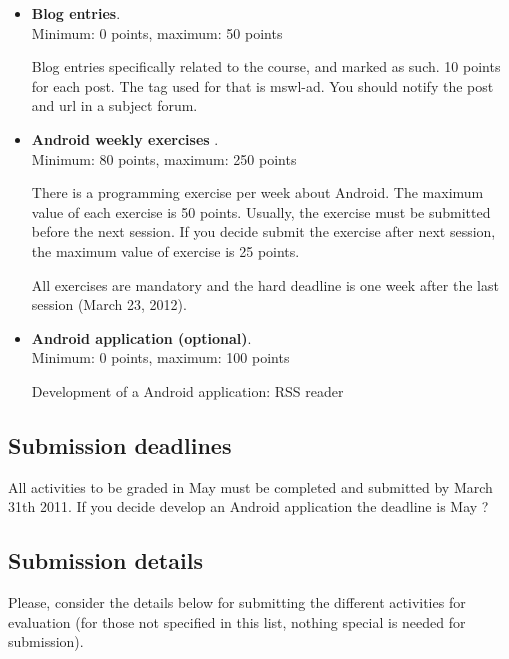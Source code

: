 \documentclass[a4paper]{article}
\begin{document}
\begin{itemize}
\item \textbf{Blog entries}. \\
  Minimum: 0 points, maximum: 50 points

  Blog entries specifically related to the course, and marked as
  such. 10 points for each post. The tag used for that is mswl-ad.
  You should notify the post and url in a subject forum.

\item \textbf{Android weekly exercises }. \\
  Minimum: 80 points, maximum: 250 points

There is a programming exercise per week about Android. The maximum
value of each exercise is 50 points. Usually, the exercise must be
submitted before the next session. If you decide submit the exercise
after next session, the maximum value of exercise is 25 points.

All exercises are mandatory and the hard deadline is one week after the
last session (March 23, 2012).


\item \textbf{Android application (optional)}. \\
  Minimum: 0 points, maximum: 100 points

Development of a Android application: RSS reader 

\end{itemize}

\subsection{Submission deadlines}

All activities to be graded in May must be completed and submitted by
March 31th 2011. If you decide develop an Android application the
deadline is May ?

\subsection{Submission details}

Please, consider the details below for submitting the different
activities for evaluation (for those not specified in this list,
nothing special is needed for submission).
\end{document}
